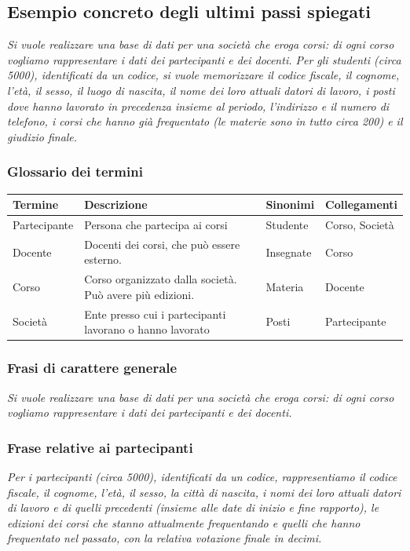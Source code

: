 \subsection{Esempio concreto degli ultimi passi spiegati}
\textit{Si vuole realizzare una base di dati per una società che eroga corsi: di ogni corso vogliamo rappresentare i dati dei partecipanti e dei docenti. Per gli studenti (circa 5000), identificati da un codice, si vuole memorizzare il codice fiscale, il cognome, l'età, il sesso, il luogo di nascita, il nome dei loro attuali datori di lavoro, i posti dove hanno lavorato in precedenza insieme al periodo, l'indirizzo e il numero di telefono, i corsi che hanno già frequentato (le materie sono in tutto circa 200) e il giudizio finale.}
\subsubsection{Glossario dei termini}
\begin{center}
	\begin{tabular}{ |l|l|l|l| } 
		\hline
		\textbf{Termine} & \textbf{Descrizione} & \textbf{Sinonimi} & \textbf{Collegamenti}\\
		\hline
		Partecipante & Persona che partecipa ai corsi & Studente & Corso, Società\\
		\hline
		Docente & Docenti dei corsi, che può essere esterno. & Insegnate & Corso\\
		\hline
		Corso & Corso organizzato dalla società. Può avere più edizioni. & Materia & Docente\\
		\hline
		Società & Ente presso cui i partecipanti lavorano o hanno lavorato & Posti & Partecipante\\
		\hline
	\end{tabular}
\end{center}
\subsubsection{Frasi di carattere generale}
\textit{Si vuole realizzare una base di dati per una società che eroga corsi: di ogni corso vogliamo rappresentare i dati dei partecipanti e dei docenti.}
\subsubsection{Frase relative ai partecipanti}
\textit{Per i partecipanti (circa 5000), identificati da un codice, rappresentiamo il codice fiscale, il cognome, l'età, il sesso, la città di nascita, i nomi dei loro attuali datori di lavoro e di quelli precedenti (insieme alle date di inizio e fine rapporto), le edizioni dei corsi che stanno attualmente frequentando e quelli che hanno frequentato nel passato, con la relativa votazione finale in decimi.}
